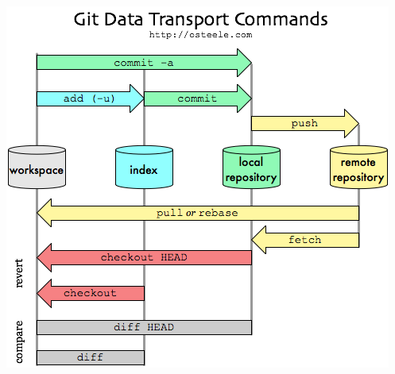 \documentclass[a4paper,11pt,twoside]{book}
\begin{document}
\begin{itemize}
\includegraphics[scale=0.6]{pics/git-transport} \\

   \end{itemize}
\end{document}
